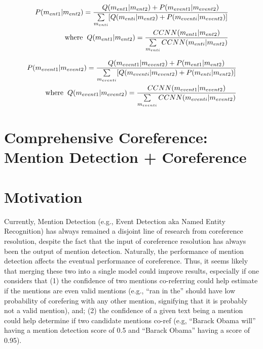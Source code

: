 \begin{equation}
\label{eq:em}
\begin{split}
P(m_{ent1}|m_{ent2}) = \frac{Q(m_{ent1}|m_{ent2}) + P(m_{event1}|m_{event2})}{\sum\limits_{m_{enti}}[Q(m_{enti}|m_{ent2})+ P(m_{eventi}|m_{event2})]} \\
\text{where} \hspace{2mm}
Q(m_{ent1}|m_{ent2}) = \frac{CCNN(m_{ent1}|m_{ent2})}{  \sum\limits_{m_{enti}} CCNN(m_{enti}|m_{ent2})  }
\end{split}
\end{equation}

\begin{equation}
\label{eq:em}
\begin{split}
P(m_{event1}|m_{event2}) = \frac{Q(m_{event1}|m_{event2}) + P(m_{ent1}|m_{ent2})}{\sum\limits_{m_{eventi}}[Q(m_{eventi}|m_{event2})+ P(m_{enti}|m_{ent2})]} \\
\text{where} \hspace{2mm}
Q(m_{event1}|m_{event2}) = \frac{CCNN(m_{event1}|m_{event2})}{  \sum\limits_{m_{eventi}} CCNN(m_{eventi}|m_{event2})  }
\end{split}
\end{equation}

\section{Comprehensive Coreference: Mention Detection + Coreference}
\section{Motivation}
Currently, Mention Detection (e.g., Event Detection aka Named Entity Recognition) has always remained a disjoint line of research from coreference resolution, despite the fact that the input of coreference resolution has always been the output of mention detection.  Naturally, the performance of mention detection affects the eventual performance of coreference.  Thus, it seems likely that merging these two into a single model could improve results, especially if one considers that (1) the confidence of two mentions co-referring could help estimate if the mentions are even valid mentions (e.g., ``ran in the'' should have low probability of corefering with any other mention, signifying that it is probably not a valid mention), and; (2) the confidence of a given text being a mention could help determine if two candidate mentions co-ref (e.g, ``Barack Obama will'' having a mention detection score of 0.5 and ``Barack Obama'' having a score of 0.95).
